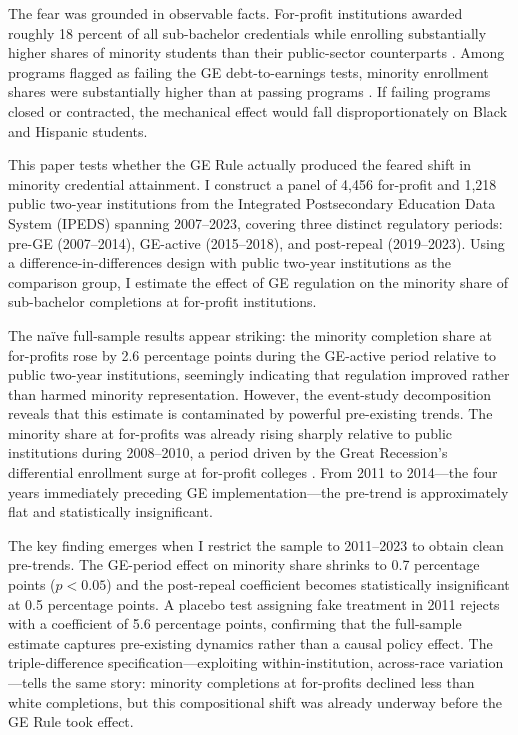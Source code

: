 \documentclass[12pt]{article}
\begin{document}
The fear was grounded in observable facts. For-profit institutions awarded roughly 18 percent of all sub-bachelor credentials while enrolling substantially higher shares of minority students than their public-sector counterparts \citep{DemingGoldinKatz2012}. Among programs flagged as failing the GE debt-to-earnings tests, minority enrollment shares were substantially higher than at passing programs \citep{TICAS2023}. If failing programs closed or contracted, the mechanical effect would fall disproportionately on Black and Hispanic students.

This paper tests whether the GE Rule actually produced the feared shift in minority credential attainment. I construct a panel of 4,456 for-profit and 1,218 public two-year institutions from the Integrated Postsecondary Education Data System (IPEDS) spanning 2007--2023, covering three distinct regulatory periods: pre-GE (2007--2014), GE-active (2015--2018), and post-repeal (2019--2023). Using a difference-in-differences design with public two-year institutions as the comparison group, I estimate the effect of GE regulation on the minority share of sub-bachelor completions at for-profit institutions.

The na\"ive full-sample results appear striking: the minority completion share at for-profits rose by 2.6 percentage points during the GE-active period relative to public two-year institutions, seemingly indicating that regulation improved rather than harmed minority representation. However, the event-study decomposition reveals that this estimate is contaminated by powerful pre-existing trends. The minority share at for-profits was already rising sharply relative to public institutions during 2008--2010, a period driven by the Great Recession's differential enrollment surge at for-profit colleges \citep{DemingGoldinKatz2012, Cellini2020}. From 2011 to 2014---the four years immediately preceding GE implementation---the pre-trend is approximately flat and statistically insignificant.

The key finding emerges when I restrict the sample to 2011--2023 to obtain clean pre-trends. The GE-period effect on minority share shrinks to 0.7 percentage points ($p < 0.05$) and the post-repeal coefficient becomes statistically insignificant at 0.5 percentage points. A placebo test assigning fake treatment in 2011 rejects with a coefficient of 5.6 percentage points, confirming that the full-sample estimate captures pre-existing dynamics rather than a causal policy effect. The triple-difference specification---exploiting within-institution, across-race variation---tells the same story: minority completions at for-profits declined less than white completions, but this compositional shift was already underway before the GE Rule took effect.
\end{document}
